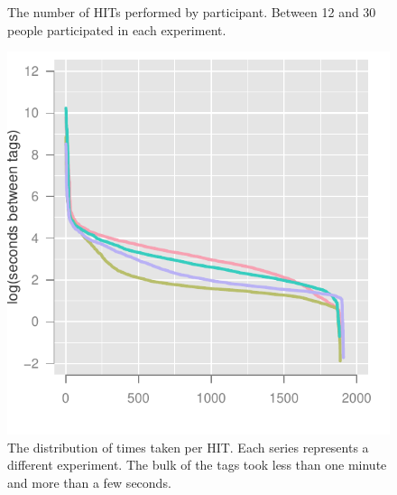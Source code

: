 \begin{figure}
\centering
\vspace{-0.10in}
%
%
%
%
\caption{The number of HITs performed by participant. Between 12 and 30 people participated in each experiment.}
\label{fig:hists}
\end{figure}

\begin{figure}
\centering
\includegraphics[width = .75\linewidth]{figures/hit_times}
\caption{The distribution of times taken per HIT.  Each series represents a different experiment.  The bulk of the tags took less than one minute and more than a few seconds.}
\label{fig:times}
\end{figure}

